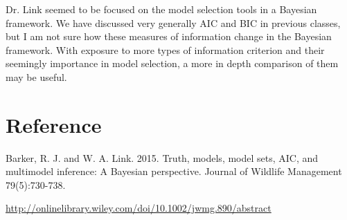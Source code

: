\documentclass{article}
\begin{document}
Dr. Link seemed to be focused on the model selection tools in a Bayesian framework. We have discussed very generally AIC and BIC in previous classes, but I am not sure how these measures of information change in the Bayesian framework. With exposure to more types of information criterion and their seemingly importance in model selection, a more in depth comparison of them may be useful.\\

\section{Reference}
Barker, R. J. and W. A. Link. 2015. Truth, models, model sets, AIC, and multimodel inference: A Bayesian perspective. Journal of Wildlife Management 79(5):730-738. 

\url{http://onlinelibrary.wiley.com/doi/10.1002/jwmg.890/abstract}
\end{document}
